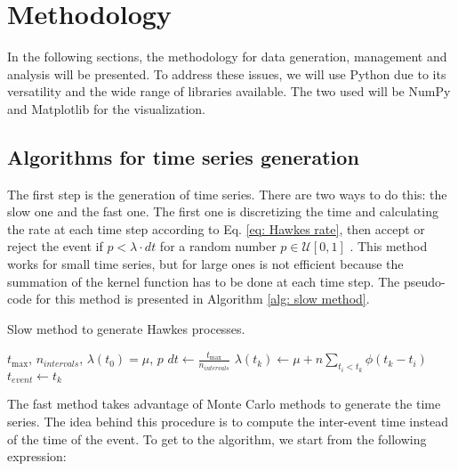 \chapter{Methodology}\label{ch:metodologia}

In the following sections, the methodology for data generation, management and analysis will be presented. To address these issues, we will use Python \cite{McKinney,VanderPlas} due to 
its versatility and the wide range of libraries available. The two used will be NumPy \cite{numpy} and Matplotlib \cite{matplotlib} for the visualization.
 
\section{Algorithms for time series generation}\label{sec:time_series_factory}

The first step is the generation of time series. There are two ways to do this: the slow one and the fast one. The first one is discretizing the time and calculating the rate at each time step
according to Eq. \ref{eq: Hawkes rate}, then accept or reject the event if $p<\lambda \cdot dt$ for a random number $p\in \mathcal{U}[0,1]$ . 
This method works for small time series, but for large ones is not efficient because the summation of the kernel function has to be done at each time step. The pseudo-code for this method is
presented in Algorithm \ref{alg: slow method}.

\begin{algorithm}
    \caption{Slow method to generate Hawkes processes.}\label{alg: slow method}
    \begin{algorithmic}
        \Require $t_\mathrm{max}$, $n_{intervals}$, $\lambda(t_0)=\mu$, $p$
        \State $dt \gets \frac{t_\mathrm{max}}{n_{intervals}}$
            \State $\lambda(t_k) \gets \mu + n\sum_{t_i<t_k}\phi(t_k-t_i)$ 
                \State $t_{event} \gets t_k$
            \EndIf
        \EndFor
        \end{algorithmic}
\end{algorithm}

The fast method takes advantage of Monte Carlo methods \cite{barbu2020monte} to generate the time series. The idea behind this procedure is to compute the inter-event time instead 
of the time of the event. To get to the algorithm, we start from the following expression:

